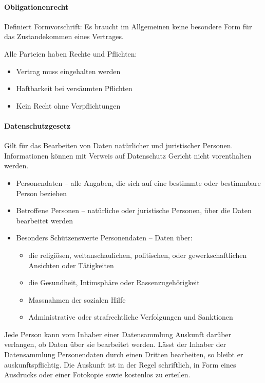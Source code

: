 \documentclass[a4paper,12pt]{article}
\begin{document}
\paragraph{Obligationenrecht} Definiert Formvorschrift: Es braucht im Allgemeinen keine besondere Form für das Zustandekommen eines Vertrages.

Alle Parteien haben Rechte und Pflichten:
\begin{itemize}
\item Vertrag muss eingehalten werden
\item Haftbarkeit bei versäumten Pflichten
\item Kein Recht ohne Verpflichtungen
\end{itemize}



\paragraph{Datenschutzgesetz}  Gilt für das Bearbeiten von Daten natürlicher und juristischer Personen. Informationen können mit Verweis auf Datenschutz Gericht nicht vorenthalten werden.

\begin{itemize}
\item Personendaten -- alle Angaben, die sich auf eine bestimmte oder bestimmbare Person beziehen
\item Betroffene Personen -- natürliche oder juristische Personen, über die Daten bearbeitet werden
\item Besonders Schützenswerte Personendaten -- Daten über:
    \begin{itemize}
    \item die religiösen, weltanschaulichen, politischen, oder gewerkschaftlichen Ansichten oder Tätigkeiten
    \item die Gesundheit, Intimsphäre oder Rassenzugehörigkeit
    \item Massnahmen der sozialen Hilfe
    \item Administrative oder strafrechtliche Verfolgungen und Sanktionen
    \end{itemize}
\end{itemize}

Jede Person kann vom Inhaber einer Datensammlung Auskunft darüber verlangen, ob Daten über sie bearbeitet werden. Lässt der Inhaber der Datensammlung Personendaten durch einen Dritten bearbeiten, so bleibt er auskunftspflichtig. Die Auskunft ist in der Regel schriftlich, in Form eines Ausdrucks oder einer Fotokopie sowie kostenlos zu erteilen.
\end{document}
